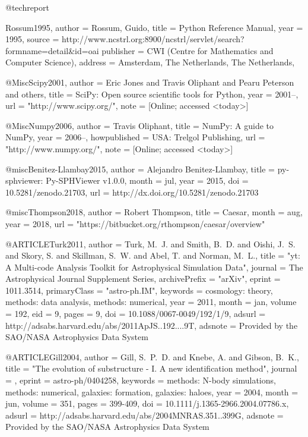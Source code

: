 @techreport{Rossum1995,
 author = {Rossum, Guido},
 title = {Python Reference Manual},
 year = {1995},
 source = {http://www.ncstrl.org:8900/ncstrl/servlet/search?formname=detail\&id=oai%
 publisher = {CWI (Centre for Mathematics and Computer Science)},
 address = {Amsterdam, The Netherlands, The Netherlands},
} 

@Misc{Scipy2001,
  author =    {Eric Jones and Travis Oliphant and Pearu Peterson and others},
  title =     {{SciPy}: Open source scientific tools for {Python}},
  year =      {2001--},
  url = "http://www.scipy.org/",
  note = {[Online; accessed <today>]}
}

@Misc{Numpy2006,
  author =    {Travis Oliphant},
  title =     {{NumPy}: A guide to {NumPy}},
  year =      {2006--},
  howpublished = {USA: Trelgol Publishing},
  url = "http://www.numpy.org/",
  note = {[Online; accessed <today>]}
 }

@misc{Benitez-Llambay2015,
 author       = {Alejandro Benitez-Llambay},
 title        = {py-sphviewer: Py-SPHViewer v1.0.0},
 month        = jul,
 year         = 2015,
 doi          = {10.5281/zenodo.21703},
 url          = {http://dx.doi.org/10.5281/zenodo.21703}
 }

@misc{Thompson2018,
 author       = {Robert Thompson},
 title        = {Caesar},
 month        = aug,
 year         = 2018,
 url          = {"https://bitbucket.org/rthompson/caesar/overview"}
 }

@ARTICLE{Turk2011,
   author = {{Turk}, M.~J. and {Smith}, B.~D. and {Oishi}, J.~S. and {Skory}, S. and
{Skillman}, S.~W. and {Abel}, T. and {Norman}, M.~L.},
    title = "{yt: A Multi-code Analysis Toolkit for Astrophysical Simulation Data}",
  journal = {The Astrophysical Journal Supplement Series},
archivePrefix = "arXiv",
   eprint = {1011.3514},
 primaryClass = "astro-ph.IM",
 keywords = {cosmology: theory, methods: data analysis, methods: numerical},
     year = 2011,
    month = jan,
   volume = 192,
      eid = {9},
    pages = {9},
      doi = {10.1088/0067-0049/192/1/9},
   adsurl = {http://adsabs.harvard.edu/abs/2011ApJS..192....9T},
  adsnote = {Provided by the SAO/NASA Astrophysics Data System}
}

@ARTICLE{Gill2004,
   author = {{Gill}, S.~P.~D. and {Knebe}, A. and {Gibson}, B.~K.},
    title = "{The evolution of substructure - I. A new identification method}",
  journal = {\mnras},
   eprint = {astro-ph/0404258},
 keywords = {methods: N-body simulations, methods: numerical, galaxies: formation, galaxies: haloes},
     year = 2004,
    month = jun,
   volume = 351,
    pages = {399-409},
      doi = {10.1111/j.1365-2966.2004.07786.x},
   adsurl = {http://adsabs.harvard.edu/abs/2004MNRAS.351..399G},
  adsnote = {Provided by the SAO/NASA Astrophysics Data System}
}

}
